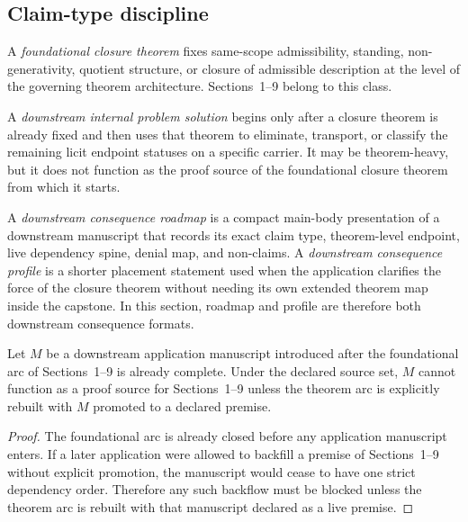\subsection{Claim-type discipline}

\begin{definition}
A \emph{foundational closure theorem} fixes same-scope admissibility, standing, non-generativity, quotient structure, or closure of admissible description at the level of the governing theorem architecture. Sections~1--9 belong to this class.
\end{definition}

\begin{definition}
A \emph{downstream internal problem solution} begins only after a closure theorem is already fixed and then uses that theorem to eliminate, transport, or classify the remaining licit endpoint statuses on a specific carrier. It may be theorem-heavy, but it does not function as the proof source of the foundational closure theorem from which it starts.
\end{definition}

\begin{definition}
A \emph{downstream consequence roadmap} is a compact main-body presentation of a downstream manuscript that records its exact claim type, theorem-level endpoint, live dependency spine, denial map, and non-claims. A \emph{downstream consequence profile} is a shorter placement statement used when the application clarifies the force of the closure theorem without needing its own extended theorem map inside the capstone. In this section, roadmap and profile are therefore both downstream consequence formats.
\end{definition}

\begin{theorem}
\label{thm:no-downstream-backflow}
Let $M$ be a downstream application manuscript introduced after the foundational arc of Sections~1--9 is already complete. Under the declared source set, $M$ cannot function as a proof source for Sections~1--9 unless the theorem arc is explicitly rebuilt with $M$ promoted to a declared premise.
\end{theorem}

\begin{proof}
The foundational arc is already closed before any application manuscript enters. If a later application were allowed to backfill a premise of Sections~1--9 without explicit promotion, the manuscript would cease to have one strict dependency order. Therefore any such backflow must be blocked unless the theorem arc is rebuilt with that manuscript declared as a live premise.
\end{proof}

